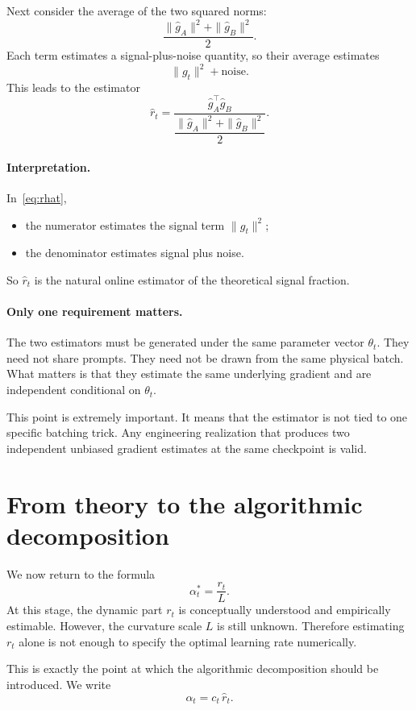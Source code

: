 \documentclass[11pt]{article}
\begin{document}
Next consider the average of the two squared norms:
\[
\frac{\|\hat g_A\|^2 + \|\hat g_B\|^2}{2}.
\]
Each term estimates a signal-plus-noise quantity, so their average estimates
\[
\|g_t\|^2 + \text{noise}.
\]
This leads to the estimator
\begin{equation}
\hat r_t
=
\frac{\hat g_A^\top \hat g_B}{\dfrac{\|\hat g_A\|^2 + \|\hat g_B\|^2}{2}}.
\label{eq:rhat}
\end{equation}

\paragraph{Interpretation.}
In~\eqref{eq:rhat},
\begin{itemize}
    \item the numerator estimates the signal term $\|g_t\|^2$;
    \item the denominator estimates signal plus noise.
\end{itemize}
So $\hat r_t$ is the natural online estimator of the theoretical signal fraction.

\paragraph{Only one requirement matters.}
The two estimators must be generated under the same parameter vector $\theta_t$. They need not share prompts. They need not be drawn from the same physical batch. What matters is that they estimate the same underlying gradient and are independent conditional on $\theta_t$.

This point is extremely important. It means that the estimator is not tied to one specific batching trick. Any engineering realization that produces two independent unbiased gradient estimates at the same checkpoint is valid.

\section{From theory to the algorithmic decomposition}

We now return to the formula
\[
\alpha_t^* = \frac{r_t}{L}.
\]
At this stage, the dynamic part $r_t$ is conceptually understood and empirically estimable. However, the curvature scale $L$ is still unknown. Therefore estimating $r_t$ alone is not enough to specify the optimal learning rate numerically.

This is exactly the point at which the algorithmic decomposition should be introduced. We write
\begin{equation}
\alpha_t = c_t\,\hat r_t.
\label{eq:algorithm-decomp}
\end{equation}
\end{document}
